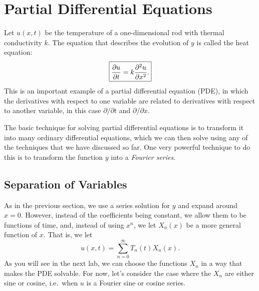 \documentclass[10pt,driverfallback=hypertex]{report}
\newcounter{small}
\begin{document}
\chapter{Partial Differential Equations}

Let $u(x,t)$ be the temperature of a one-dimensional rod with thermal
conductivity $k$. The equation that describes the evolution of $y$ is
called the heat equation:
\begin{dmath*}
  \boxed{  \pp{u}{t} =  k\pptwo{u}{x}. }
\end{dmath*}
This is an important example of a partial differential equation (PDE),
in which the derivatives with respect to one variable are related to
derivatives with respect to another variable, in this case
$\partial/\partial t$ and $\partial/\partial x$.

The basic technique for solving partial differential equations is to
transform it into many ordinary differential equations, which we can then
solve using any of the techniques that we have discussed so far. One
very powerful technique to do this is to transform the function $y$
into a \emph{Fourier series}.

\section{Separation of Variables}
As in the previous section, we use a series solution for $y$ and
expand around $x=0$. However, instead of the coefficients being
constant, we allow them to be functions of time, and, instead of using
$x^n$, we let $X_n(x)$ be a more general function of $x$. That is, we
let
\begin{dmath*}
  \boxed{u(x,t) = \sum_{n=0}^\infty T_n(t) X_n(x).}
\end{dmath*}
As you will see in the next lab, we can choose the functions $X_n$ in
a way that makes the PDE solvable. For now, let's consider the case
where the $X_n$ are either sine or cosine, i.e.\ when $u$ is a Fourier
sine or cosine series.
\end{document}
